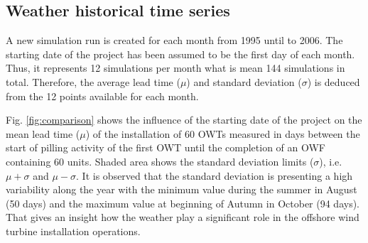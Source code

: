 \subsection{Weather historical time series}

A new simulation run is created for each month from 1995 until to 2006. The starting date of the project has been assumed to be the first day of each month. Thus, it represents 12 simulations per month what is mean 144 simulations in total. Therefore, the average lead time ($\mu$) and standard deviation ($\sigma$) is deduced from the 12 points available for each month.

Fig. \ref{fig:comparison} shows the influence of the starting date of the project on the mean lead time ($\mu$) of the installation of 60 OWTs measured in days between the start of pilling activity of the first OWT until the completion of an OWF containing 60 units. Shaded area shows the standard deviation limits ($\sigma$), i.e. $\mu + \sigma$ and $\mu - \sigma$. It is observed that the standard deviation is presenting a high variability along the year with the minimum value during the summer in August (50 days) and the maximum value at beginning of Autumn in October (94 days). That gives an insight how the weather play a significant role in the offshore wind turbine installation operations.